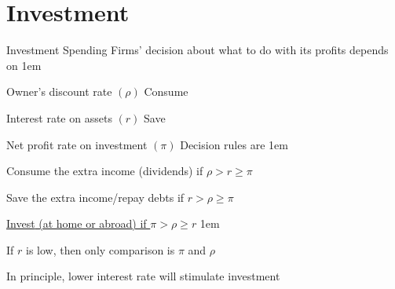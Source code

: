 \documentclass[11pt,aspectratio=43,usenames,dvipsnames]{beamer}
\let\olditemize=\itemize
\let\endolditemize=\enditemize
\renewenvironment{itemize}{\olditemize \itemsep1em}{\endolditemize}
\theoremstyle{definition}
\begin{document}
\section[$I$]{Investment}
\label{sec:Investment}


\begin{frame}{Investment Spending}
\label{slide:Investment_Spending}
    Firms’ decision about what to do with its profits depends on
    \begin{itemize}
        \item Owner’s discount rate $ (\rho) $ Consume
        \item Interest rate on assets $(r)$ Save
        \item Net profit rate on investment $ (\pi) $
    \end{itemize}
    Decision rules are
    \begin{itemize}
        \item \alert{Consume} the extra income (dividends) if $ \rho > r \ge \pi $
        \item \alert{Save} the extra income/repay debts if $ r > \rho \ge \pi $
        \item \underline{\alert{Invest} (at home or abroad) if $ \pi > \rho \ge r $}
        \begin{itemize}
            \item If $ r $ is low, then only comparison is $ \pi $ and $ \rho $
            \item \alert{In principle}, lower interest rate will stimulate investment
        \end{itemize}

    \end{itemize}

\end{frame}
\end{document}
